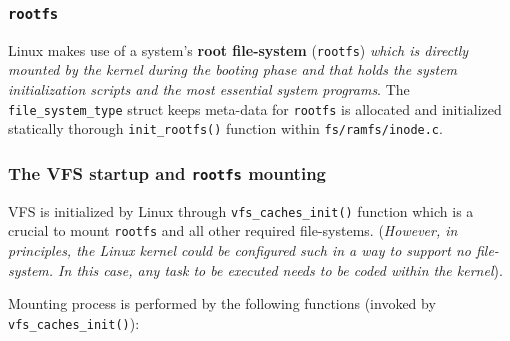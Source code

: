 \documentclass[10pt,a4paper]{article}
\begin{document}
\subsubsection{\texttt{rootfs}}

Linux makes use of a system's \textbf{root file-system} (\texttt{rootfs}) \textit{which is directly mounted by the kernel during the booting phase and that holds the system initialization scripts and the most essential system programs}. The \texttt{file\_system\_type} struct keeps meta-data for \texttt{rootfs} is allocated and initialized statically thorough \texttt{init\_rootfs()} function within \texttt{fs/ramfs/inode.c}.

\subsubsection{The VFS startup and \texttt{rootfs} mounting}

VFS is initialized by Linux through \texttt{vfs\_caches\_init()} function which is a crucial to mount \texttt{rootfs} and all other required file-systems. (\textit{However, in principles, the Linux kernel could be configured such in a way to support no file-system. In this case, any task to be executed needs to be coded within the kernel}).

Mounting process is performed by the following functions (invoked by \texttt{vfs\_caches\_init()}):
\end{document}
